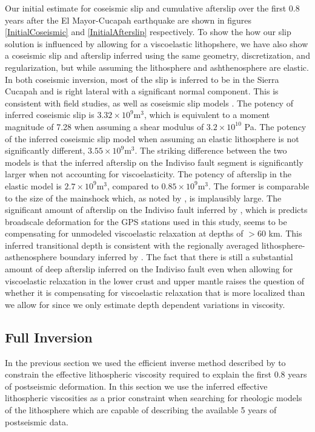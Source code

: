 \documentclass[12pt]{article}
\begin{document}
Our initial estimate for coseismic slip and cumulative afterslip over the first 0.8 years after the El Mayor-Cucapah earthquake are shown in figures \ref{InitialCoseismic} and \ref{InitialAfterslip} respectively. To show the how our slip solution is influenced by allowing for a viscoelastic lithopshere, we have also show a coseismic slip and afterslip inferred using the same geometry, discretization, and regularization, but while assuming the lithosphere and ashthenosphere are elastic.  In both coseismic inversion, most of the slip is inferred to be in the Sierra Cucapah and is right lateral with a significant normal component. This is consistent with field studies, \cite{Fletcher2014} as well as coseismic slip models \cite{Wei2011}.  The potency of inferred coseismic slip is $3.32\times 10^{9} \mathrm{m}^3$, which is equivalent to a moment magnitude of 7.28 when assuming a shear modulus of $3.2\times10^{10}$ Pa. The potency of the inferred coseismic slip model when assuming an elastic lithosphere is not significantly different, $3.55\times 10^9 \mathrm{m}^3$.  The striking difference between the two models is that the inferred afterslip on the Indiviso fault segment is significantly larger when not accounting for viscoelasticity.  The potency of afterslip in the elastic model is $2.7\times 10^9 \mathrm{m}^3$, compared to $0.85\times 10^9 \mathrm{m}^3$.  The former is comparable to the size of the mainshock which, as noted by \cite{Rollins2015}, is implausibly large. The significant amount of afterslip on the Indiviso fault inferred by \cite{Rollins2015}, which is predicts broadscale deformation for the GPS stations used in this study, seems to be compensating for unmodeled viscoelastic relaxation at depths of $>60$ km. This inferred transitional depth is consistent with the regionally averaged lithosphere-asthenosphere boundary inferred by \cite{Lekic2011}.  The fact that there is still a substantial amount of deep afterslip inferred on the Indiviso fault even when allowing for viscoelastic relaxation in the lower crust and upper mantle raises the question of whether it is compensating for viscoelastic relaxation that is more localized than we allow for since we only estimate depth dependent variations in viscosity.  
 
 
\subsection{Full Inversion}\label{FullInversion} 

In the previous section we used the efficient inverse method described by \cite{Hines2015} to constrain the effective lithospheric viscosity required to explain the first 0.8 years of postseismic deformation. In this section we use the inferred effective lithospheric viscosities as a prior constraint when searching for rheologic models of the lithosphere which are capable of describing the available 5 years of postseismic data.   
\end{document}
